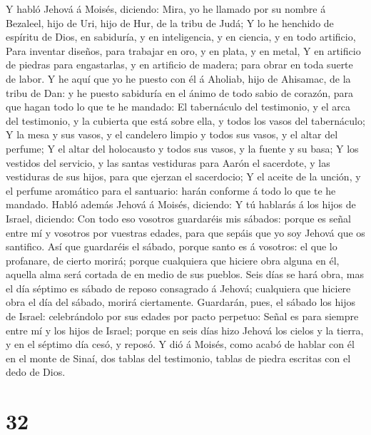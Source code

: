  Y habló Jehová á Moisés, diciendo:  Mira, yo he
llamado por su nombre á Bezaleel, hijo de Uri, hijo de Hur, de la tribu
de Judá;  Y lo he henchido de espíritu de Dios, en
sabiduría, y en inteligencia, y en ciencia, y en todo artificio,
 Para inventar diseños, para trabajar en oro, y en plata, y
en metal,  Y en artificio de piedras para engastarlas, y en
artificio de madera; para obrar en toda suerte de labor.  Y
he aquí que yo he puesto con él á Aholiab, hijo de Ahisamac, de la tribu
de Dan: y he puesto sabiduría en el ánimo de todo sabio de corazón, para
que hagan todo lo que te he mandado:  El tabernáculo del
testimonio, y el arca del testimonio, y la cubierta que está sobre ella,
y todos los vasos del tabernáculo;  Y la mesa y sus vasos, y
el candelero limpio y todos sus vasos, y el altar del perfume;
 Y el altar del holocausto y todos sus vasos, y la fuente y
su basa;  Y los vestidos del servicio, y las santas
vestiduras para Aarón el sacerdote, y las vestiduras de sus hijos, para
que ejerzan el sacerdocio;  Y el aceite de la unción, y el
perfume aromático para el santuario: harán conforme á todo lo que te he
mandado.  Habló además Jehová á Moisés, diciendo:
 Y tú hablarás á los hijos de Israel, diciendo: Con todo
eso vosotros guardaréis mis sábados: porque es señal entre mí y vosotros
por vuestras edades, para que sepáis que yo soy Jehová que os santifico.
 Así que guardaréis el sábado, porque santo es á vosotros:
el que lo profanare, de cierto morirá; porque cualquiera que hiciere
obra alguna en él, aquella alma será cortada de en medio de sus pueblos.
 Seis días se hará obra, mas el día séptimo es sábado de
reposo consagrado á Jehová; cualquiera que hiciere obra el día del
sábado, morirá ciertamente.  Guardarán, pues, el sábado los
hijos de Israel: celebrándolo por sus edades por pacto perpetuo:
 Señal es para siempre entre mí y los hijos de Israel;
porque en seis días hizo Jehová los cielos y la tierra, y en el séptimo
día cesó, y reposó.  Y dió á Moisés, como acabó de hablar
con él en el monte de Sinaí, dos tablas del testimonio, tablas de piedra
escritas con el dedo de Dios.

\hypertarget{section-31}{%
\section{32}\label{section-31}}

